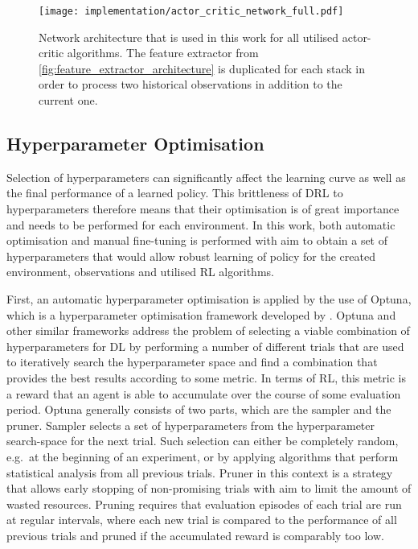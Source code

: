 \begin{figure}[ht]
    \centering
    \texttt{[image: implementation/actor\_critic\_network\_full.pdf]}
    \caption{Network architecture that is used in this work for all utilised actor-critic algorithms. The feature extractor from \protect\autoref{fig:feature_extractor_architecture} is duplicated for each stack in order to process two historical observations in addition to the current one.}
    \label{fig:actor_critic_network}
\end{figure}


\subsection{Hyperparameter Optimisation}

Selection of hyperparameters can significantly affect the learning curve as well as the final performance of a learned policy. This brittleness of DRL to hyperparameters therefore means that their optimisation is of great importance and needs to be performed for each environment. In this work, both automatic optimisation and manual fine-tuning is performed with aim to obtain a set of hyperparameters that would allow robust learning of policy for the created environment, observations and utilised RL algorithms.

First, an automatic hyperparameter optimisation is applied by the use of Optuna, which is a hyperparameter optimisation framework developed by \citet{akiba_optuna_2019}. Optuna and other similar frameworks address the problem of selecting a viable combination of hyperparameters for DL by performing a number of different trials that are used to iteratively search the hyperparameter space and find a combination that provides the best results according to some metric. In terms of RL, this metric is a reward that an agent is able to accumulate over the course of some evaluation period. Optuna generally consists of two parts, which are the sampler and the pruner. Sampler selects a set of hyperparameters from the hyperparameter search-space for the next trial. Such selection can either be completely random, e.g.~at the beginning of an experiment, or by applying algorithms that perform statistical analysis from all previous trials. Pruner in this context is a strategy that allows early stopping of non-promising trials with aim to limit the amount of wasted resources. Pruning requires that evaluation episodes of each trial are run at regular intervals, where each new trial is compared to the performance of all previous trials and pruned if the accumulated reward is comparably too low.

